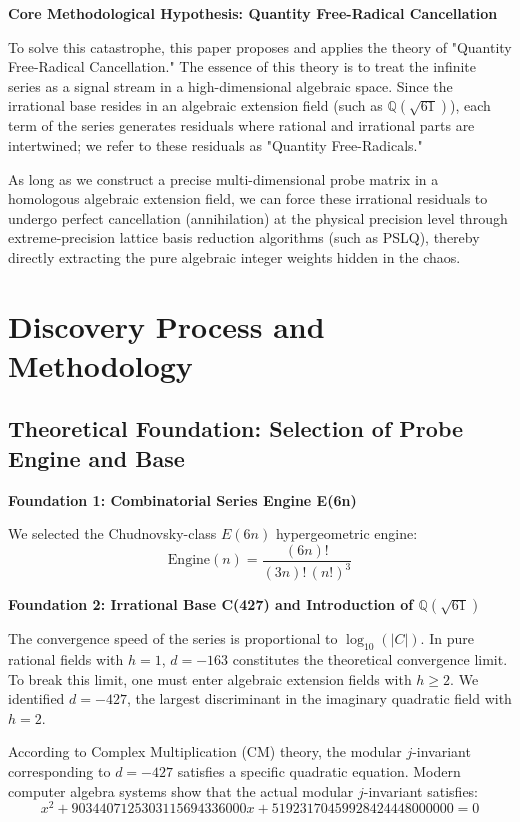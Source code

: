 \documentclass[11pt,a4paper]{article}
\begin{document}
\textbf{Core Methodological Hypothesis: Quantity Free-Radical Cancellation}

To solve this catastrophe, this paper proposes and applies the theory of "Quantity Free-Radical Cancellation." The essence of this theory is to treat the infinite series as a signal stream in a high-dimensional algebraic space. Since the irrational base resides in an algebraic extension field (such as $\mathbb{Q}(\sqrt{61})$), each term of the series generates residuals where rational and irrational parts are intertwined; we refer to these residuals as "Quantity Free-Radicals."

As long as we construct a precise multi-dimensional probe matrix in a homologous algebraic extension field, we can force these irrational residuals to undergo perfect cancellation (annihilation) at the physical precision level through extreme-precision lattice basis reduction algorithms (such as PSLQ), thereby directly extracting the pure algebraic integer weights hidden in the chaos.

\section{Discovery Process and Methodology}

\subsection{Theoretical Foundation: Selection of Probe Engine and Base}

\textbf{Foundation 1: Combinatorial Series Engine E(6n)}

We selected the Chudnovsky-class $E(6n)$ hypergeometric engine:
\begin{equation}
\text{Engine}(n) = \frac{(6n)!}{(3n)!\,(n!)^3}
\end{equation}

\textbf{Foundation 2: Irrational Base C(427) and Introduction of $\mathbb{Q}(\sqrt{61})$}

The convergence speed of the series is proportional to $\log_{10}(|C|)$. In pure rational fields with $h=1$, $d=-163$ constitutes the theoretical convergence limit. To break this limit, one must enter algebraic extension fields with $h \ge 2$. We identified $d=-427$, the largest discriminant in the imaginary quadratic field with $h=2$.

According to Complex Multiplication (CM) theory, the modular $j$-invariant corresponding to $d=-427$ satisfies a specific quadratic equation. Modern computer algebra systems show that the actual modular $j$-invariant satisfies:
\begin{equation}
x^2 + 9034407125303115694336000x + 51923170459928424448000000 = 0
\end{equation}
\end{document}
